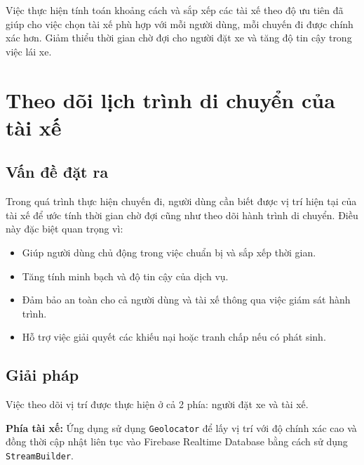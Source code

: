 \documentclass[../DoAn.tex]{subfiles}
\begin{document}
Việc thực hiện tính toán khoảng cách và sắp xếp các tài xế theo độ ưu tiên đã giúp cho việc chọn tài xế phù hợp với mỗi người dùng, mỗi chuyến đi được chính xác hơn.
Giảm thiểu thời gian chờ đợi cho người đặt xe và tăng độ tin cậy trong việc lái xe.

\section{Theo dõi lịch trình di chuyển của tài xế}
\label{section:5.3}

\subsection{Vấn đề đặt ra}
\label{subsection:5.3.1}
Trong quá trình thực hiện chuyến đi, người dùng cần biết được vị trí hiện tại của tài xế để ước tính thời gian chờ đợi cũng như theo dõi hành trình di chuyển. Điều này đặc biệt quan trọng vì:
\begin{itemize}
  \item Giúp người dùng chủ động trong việc chuẩn bị và sắp xếp thời gian.
  \item Tăng tính minh bạch và độ tin cậy của dịch vụ.
  \item Đảm bảo an toàn cho cả người dùng và tài xế thông qua việc giám sát hành trình.
  \item Hỗ trợ việc giải quyết các khiếu nại hoặc tranh chấp nếu có phát sinh.
\end{itemize}

\subsection{Giải pháp}
\label{subsection:5.3.2}
Việc theo dõi vị trí được thực hiện ở cả 2 phía: người đặt xe và tài xế.

\textbf{Phía tài xế:} Ứng dụng sử dụng \texttt{Geolocator} để lấy vị trí với độ chính xác cao và đồng thời 
cập nhật liên tục vào Firebase Realtime Database bằng cách sử dụng \texttt{StreamBuilder}.
\end{document}
